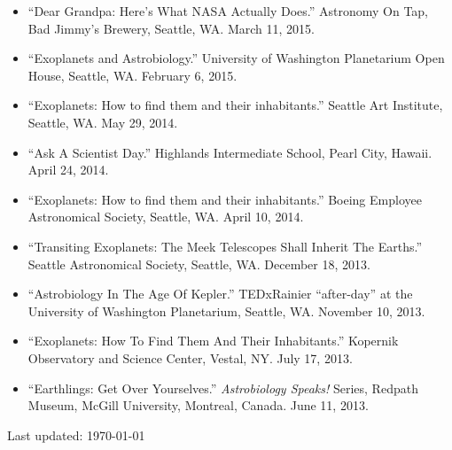\documentclass[margin]{res}
\begin{document}
\begin{resume}
\begin{itemize}
\item ``Dear Grandpa: Here's What NASA Actually Does.'' Astronomy On Tap, Bad Jimmy's Brewery, Seattle, WA. March 11, 2015.

\item ``Exoplanets and Astrobiology.'' University of Washington Planetarium Open House, Seattle, WA. February 6, 2015.

\item ``Exoplanets: How to find them and their inhabitants.'' Seattle Art Institute, Seattle, WA. May 29, 2014.

\item ``Ask A Scientist Day.'' Highlands Intermediate School, Pearl City, Hawaii. April 24, 2014.

\item ``Exoplanets: How to find them and their inhabitants.'' Boeing Employee Astronomical Society, Seattle, WA. April 10, 2014.

\item ``Transiting Exoplanets: The Meek Telescopes Shall Inherit The Earths.'' Seattle Astronomical Society, Seattle, WA. December 18, 2013.

\item ``Astrobiology In The Age Of Kepler.'' TEDxRainier ``after-day'' at the University of Washington Planetarium, Seattle, WA. November 10, 2013. 

\item ``Exoplanets: How To Find Them And Their Inhabitants.'' Kopernik Observatory and Science Center, Vestal, NY. July 17, 2013. 

\item ``Earthlings: Get Over Yourselves.'' \textit{Astrobiology Speaks!} Series, Redpath Museum, McGill University, Montreal, Canada. June 11, 2013.
\end{itemize}
\vfill \hfill {\small Last updated: \today}
\end{resume}
\end{document}
